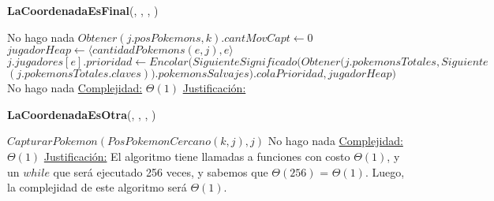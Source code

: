 \begin{algorithm}[H]{\textbf{LaCoordenadaEsFinal}(, , , )}   
    \begin{algorithmic}[1]
                                \State \Comment No hago nada
                            \Else
                                \State $Obtener(j.posPokemons, k).cantMovCapt \gets 0$
                                \State $jugadorHeap \gets \langle cantidadPokemons(e,j), e \rangle$
                                \State $j.jugadores[e].prioridad \gets Encolar(SiguienteSignificado(Obtener(j.pokemonsTotales, Siguiente$ $(j.pokemonsTotales.claves)).pokemonsSalvajes).colaPrioridad, jugadorHeap)$
                            \EndIf
                        \Else
                            \State \Comment No hago nada
                        \EndIf
                    \EndIf
                \EndIf
                \medskip
                \Statex \underline{Complejidad:} $\Theta(1)$
        \Statex \underline{Justificación:}  
    \end{algorithmic}
\end{algorithm} 

\begin{algorithm}[H]{\textbf{LaCoordenadaEsOtra}(, , , )}    
    \begin{algorithmic}[1]
                            \State $CapturarPokemon(PosPokemonCercano(k,j), j)$
                        \EndIf
                    \Else
                        \State \Comment No hago nada
                    \EndIf
                \EndIf
        \medskip
        \Statex \underline{Complejidad:} $\Theta(1)$
        \Statex \underline{Justificación:}  El algoritmo tiene llamadas a funciones con costo $\Theta(1)$, y un $while$ que será ejecutado 256 veces, y sabemos que $\Theta (256)$ = $\Theta (1)$. Luego, la complejidad de este algoritmo será $\Theta (1)$.
    \end{algorithmic}
\end{algorithm} 

